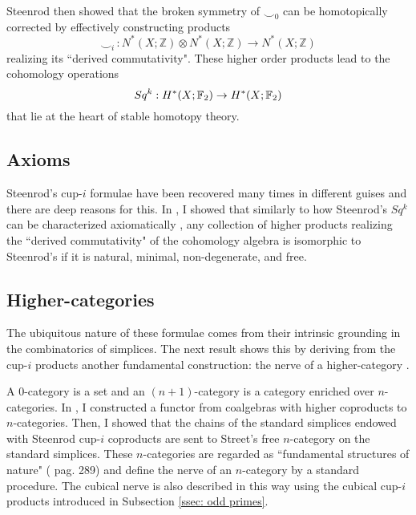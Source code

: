Steenrod \cite{steenrod1947products} then showed that the broken symmetry of $\smallsmile_0$ can be homotopically corrected by effectively constructing products
\begin{equation*}
\smallsmile_i\, : N^*(X; \mathbb Z) \otimes N^*(X; \mathbb Z) \to N^*(X; \mathbb Z)
\end{equation*}
realizing its ``derived commutativity".
These higher order products lead to the cohomology operations
\begin{equation*}
Sq^k : H^*(X; {\mathbb{F}_2}) \to H^{*}(X; {\mathbb{F}_2})
\end{equation*}
that lie at the heart of stable homotopy theory.

\subsection{Axioms}
Steenrod's cup-$i$ formulae have been recovered many times \cite{gonzalez-diaz1999steenrod, mcclure2003multivariable, berger2004combinatorial, medina2020prop1} in different guises and there are deep reasons for this.
In \cite{medina2018axiomatic}, I showed that similarly to how Steenrod's $Sq^k$ can be characterized axiomatically \cite{steenrod1962cohomology}, any collection of higher products realizing the ``derived commutativity" of the cohomology algebra is isomorphic to Steenrod's if it is natural, minimal, non-degenerate, and free.

\subsection{Higher-categories}
The ubiquitous nature of these formulae comes from their intrinsic grounding in the combinatorics of simplices.
The next result shows this by deriving from the cup-$i$ products another fundamental construction: the nerve of a higher-category \cite{street1987orientals}.

A $0$-category is a set and an $(n+1)$-category is a category enriched over $n$-categories.
In \cite{medina2020globular}, I constructed a functor from coalgebras with higher coproducts to $n$-categories.
Then, I showed that the chains of the standard simplices endowed with Steenrod cup-$i$ coproducts are sent to Street's free $n$-category on the standard simplices.
These $n$-categories are regarded as ``fundamental structures of nature" (\cite{street1987orientals} pag. 289) and define the nerve of an $n$-category by a standard procedure.
The cubical nerve is also described in this way using the cubical cup-$i$ products introduced in Subsection \ref{ssec: odd primes}.

